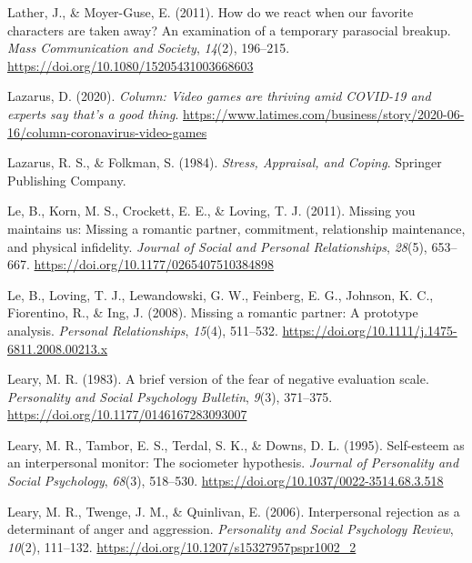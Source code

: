 \documentclass[
]{udthesis}
\newlength{\cslhangindent}
\newenvironment{CSLReferences}[2] %
 {\begin{list}{}{%
  \setlength{\itemindent}{0pt}
  \setlength{\leftmargin}{0pt}
  \setlength{\parsep}{0pt}
  \ifodd #1
   \setlength{\leftmargin}{\cslhangindent}
   \setlength{\itemindent}{-1\cslhangindent}
  \fi
  \setlength{\itemsep}{#2\baselineskip}}}
 {\end{list}}
\begin{document}
\begin{CSLReferences}{1}{0}
Lather, J., \& Moyer-Guse, E. (2011). How do we react when our favorite characters are taken away? An examination of a temporary parasocial breakup. \emph{Mass Communication and Society}, \emph{14}(2), 196--215. \url{https://doi.org/10.1080/15205431003668603}

Lazarus, D. (2020). \emph{Column: Video games are thriving amid COVID-19 {\textemdash} and experts say that's a good thing}. \url{https://www.latimes.com/business/story/2020-06-16/column-coronavirus-video-games}

Lazarus, R. S., \& Folkman, S. (1984). \emph{Stress, {Appraisal}, and {Coping}}. {Springer Publishing Company}.

Le, B., Korn, M. S., Crockett, E. E., \& Loving, T. J. (2011). Missing you maintains us: Missing a romantic partner, commitment, relationship maintenance, and physical infidelity. \emph{Journal of Social and Personal Relationships}, \emph{28}(5), 653--667. \url{https://doi.org/10.1177/0265407510384898}

Le, B., Loving, T. J., Lewandowski, G. W., Feinberg, E. G., Johnson, K. C., Fiorentino, R., \& Ing, J. (2008). Missing a romantic partner: A prototype analysis. \emph{Personal Relationships}, \emph{15}(4), 511--532. \url{https://doi.org/10.1111/j.1475-6811.2008.00213.x}

Leary, M. R. (1983). A brief version of the fear of negative evaluation scale. \emph{Personality and Social Psychology Bulletin}, \emph{9}(3), 371--375. \url{https://doi.org/10.1177/0146167283093007}

Leary, M. R., Tambor, E. S., Terdal, S. K., \& Downs, D. L. (1995). Self-esteem as an interpersonal monitor: {The} sociometer hypothesis. \emph{Journal of Personality and Social Psychology}, \emph{68}(3), 518--530. \url{https://doi.org/10.1037/0022-3514.68.3.518}

Leary, M. R., Twenge, J. M., \& Quinlivan, E. (2006). Interpersonal rejection as a determinant of anger and aggression. \emph{Personality and Social Psychology Review}, \emph{10}(2), 111--132. \url{https://doi.org/10.1207/s15327957pspr1002_2}


\end{CSLReferences}
\end{document}
